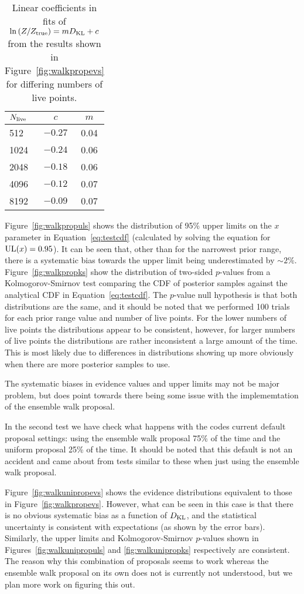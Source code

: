 \begin{table}[h]
\caption{Linear coefficients in fits of $\ln{(Z/Z_{\rm true})} = mD_{\rm KL} + c$ from the results
shown in Figure~\ref{fig:walkpropevs} for differing numbers of live points.\label{tab:klvsz}}
\begin{center}
\begin{tabular}{l c c}
\hline
\hline
$N_{\rm live}$ & $c$ & $m$ \\
\hline
512 & $-0.27$ & 0.04 \\
1024 & $-0.24$ & 0.06 \\
2048 & $-0.18$ & 0.06 \\
4096 & $-0.12$ & 0.07 \\
8192 & $-0.09$ & 0.07 \\
\hline
\end{tabular}
\end{center}
\end{table}

Figure~\ref{fig:walkpropuls} shows the distribution of 95\% upper limits on the $x$ parameter in Equation~\ref{eq:testcdf} (calculated by solving
the equation for ${\rm UL}(x) = 0.95$). It can be seen that, other than for the narrowest prior range, there is a systematic bias towards the
upper limit being underestimated by $\sim 2\%$. Figure~\ref{fig:walkpropks} show the distribution of two-sided $p$-values from a Kolmogorov-Smirnov
test comparing the CDF of posterior samples against the analytical CDF in Equation~\ref{eq:testcdf}. The $p$-value null hypothesis is that both
distributions are the same, and it should be noted that we performed 100 trials for each prior range value and number of live points. For the
lower numbers of live points the distributions appear to be consistent, however, for larger numbers of live points the distributions are rather
inconsistent a large amount of the time. This is most likely due to differences in distributions showing up more obviously when there are more
posterior samples to use.

The systematic biases in evidence values and upper limits may not be major problem, but does point towards there being some issue with the
implememtation of the ensemble walk proposal.

In the second test we have check what happens with the codes current default proposal settings: using the ensemble walk proposal 75\%
of the time and the uniform proposal 25\% of the time. It should be noted that this default is not an accident and came about from tests
similar to these when just using the ensemble walk proposal.

Figure~\ref{fig:walkunipropevs} shows the evidence distributions equivalent to those in Figure~\ref{fig:walkpropevs}. However, what can
be seen in this case is that there is no obvious systematic bias as a function of $D_{\rm KL}$, and the statistical uncertainty is
consistent with expectations (as shown by the error bars). Similarly, the upper limits and Kolmogorov-Smirnov $p$-values shown in
Figures~\ref{fig:walkunipropuls} and \ref{fig:walkunipropks} respectively are consistent. The reason why this combination of proposals
seems to work whereas the ensemble walk proposal on its own does not is currently not understood, but we plan more work on figuring this
out.